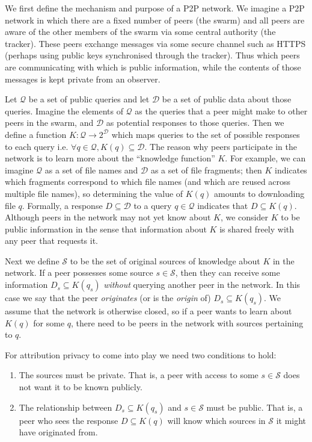 \documentclass{article}
\begin{document}
We first define the mechanism and purpose of a P2P network. We imagine a P2P
network in which there are a fixed number of peers (the swarm) and all peers are
aware of the other members of the swarm via some central authority (the
tracker). These peers exchange messages via some secure channel such as HTTPS
(perhaps using public keys synchronised through the tracker). Thus which peers
are communicating with which is public information, while the contents of those
messages is kept private from an observer.

Let $\mathcal{Q}$ be a set of public queries and let $\mathcal{D}$ be a set of
public data about those queries. Imagine the elements of $\mathcal{Q}$ as the
queries that a peer might make to other peers in the swarm, and $\mathcal{D}$ as
potential responses to those queries. Then we define a function
$K:\mathcal{Q}\rightarrow 2^\mathcal{D}$ which maps queries to the set of
possible responses to each query i.e. $\forall q\in\mathcal{Q},
K(q)\subseteq\mathcal{D}$. The reason why peers participate in the network is to
learn more about the ``knowledge function'' $K$. For example, we can imagine
$\mathcal{Q}$ as a set of file names and $\mathcal{D}$ as a set of file
fragments; then $K$ indicates which fragments correspond to which file names
(and which are reused across multiple file names), so determining the value of
$K(q)$ amounts to downloading file $q$. Formally, a response
$D\subseteq\mathcal{D}$ to a query $q\in\mathcal{Q}$ indicates that $D\subseteq
K(q)$. Although peers in the network may not yet know about $K$, we consider $K$
to be public information in the sense that information about $K$ is shared
freely with any peer that requests it.

Next we define $\mathcal{S}$ to be the set of original sources of knowledge
about $K$ in the network. If a peer possesses some source $s\in\mathcal{S}$,
then they can receive some information $D_s\subseteq K(q_s)$ {\it without}
querying another peer in the network. In this case we say that the peer {\it
originates} (or is the {\it origin} of) $D_s\subseteq K(q_s)$. We assume that
the network is otherwise closed, so if a peer wants to learn about $K(q)$ for
some $q$, there need to be peers in the network with sources pertaining to $q$.

For attribution privacy to come into play we need two conditions to hold:
\begin{enumerate}
	\item The sources must be private. That is, a peer with access to some
		$s\in\mathcal{S}$ does not want it to be known publicly.
	\item The relationship between $D_s\subseteq K(q_s)$ and $s\in\mathcal{S}$
		must be public. That is, a peer who sees the response $D\subseteq K(q)$
		will know which sources in $\mathcal{S}$ it might have originated from.
\end{enumerate}
\end{document}

